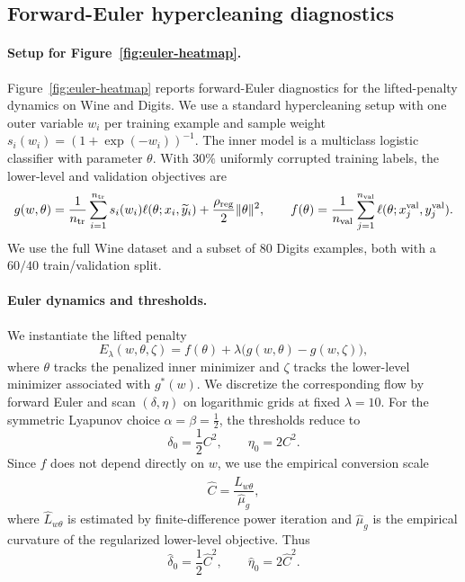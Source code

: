 \documentclass{article}
\newcommand{\1}{\mathbf{1}}
\begin{document}
\subsection{Forward-Euler hypercleaning diagnostics}
\label{app:euler-hypercleaning}

\paragraph{Setup for Figure~\ref{fig:euler-heatmap}.}
Figure~\ref{fig:euler-heatmap} reports forward-Euler diagnostics for the
lifted-penalty dynamics on Wine and Digits. We use a standard hypercleaning
setup with one outer variable $w_i$ per training example and sample weight
$s_i(w_i)=(1+\exp(-w_i))^{-1}$. The inner model is a multiclass logistic
classifier with parameter $\theta$. With $30\%$ uniformly corrupted training
labels, the lower-level and validation objectives are
\[
g(w,\theta)
=
\frac{1}{n_{\mathrm{tr}}}
\sum_{i=1}^{n_{\mathrm{tr}}}
s_i(w_i)\ell(\theta;x_i,\widetilde y_i)
+
\frac{\rho_{\rm reg}}{2}\|\theta\|^2,
\qquad
f(\theta)
=
\frac{1}{n_{\mathrm{val}}}
\sum_{j=1}^{n_{\mathrm{val}}}
\ell(\theta;x_j^{\mathrm{val}},y_j^{\mathrm{val}}).
\]
We use the full Wine dataset and a subset of $80$ Digits examples, both with a
$60/40$ train/validation split.

\paragraph{Euler dynamics and thresholds.}
We instantiate the lifted penalty
\[
E_\lambda(w,\theta,\zeta)
=
f(\theta)+\lambda\bigl(g(w,\theta)-g(w,\zeta)\bigr),
\]
where $\theta$ tracks the penalized inner minimizer and $\zeta$ tracks the
lower-level minimizer associated with $g^*(w)$. We discretize the corresponding
flow by forward Euler and scan $(\delta,\eta)$ on logarithmic grids at fixed
$\lambda=10$. For the symmetric Lyapunov choice $\alpha=\beta=\tfrac12$, the
thresholds reduce to
\[
\delta_0=\frac12 C^2,
\qquad
\eta_0=2C^2.
\]
Since $f$ does not depend directly on $w$, we use the empirical conversion scale
\[
\widehat C=\frac{\widehat L_{w\theta}}{\widehat\mu_g},
\]
where $\widehat L_{w\theta}$ is estimated by finite-difference power iteration
and $\widehat\mu_g$ is the empirical curvature of the regularized lower-level
objective. Thus
\[
\widehat\delta_0=\frac12\widehat C^2,
\qquad
\widehat\eta_0=2\widehat C^2.
\]
\end{document}
